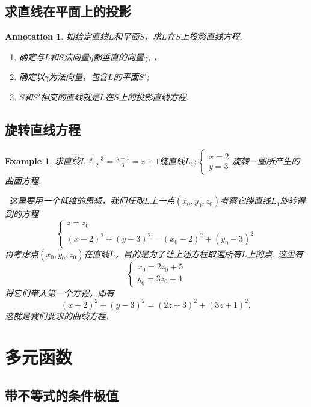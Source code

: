 \documentclass{article}
\newtheorem{example}[theorem]{Example}
\newtheorem{annotation}[theorem]{Annotation}
\newcommand{\hints}{{\color{blue} \text{hints}}}
\begin{document}
\subsection{求直线在平面上的投影}

\begin{annotation}
\rm 如给定直线$L$和平面$S$，求$L$在$S$上投影直线方程. 
\begin{enumerate}
	\item 确定与$L$和$S$法向量$\eta$都垂直的向量$\gamma$; 、
	\item 确定以$\gamma$为法向量，包含$L$的平面$S'$;
	\item $S$和$S'$相交的直线就是$L$在$S$上的投影直线方程. 
\end{enumerate}
\end{annotation}


\subsection{旋转直线方程}

\begin{example}
\rm 求直线$L: \frac{x-3}{2} = \frac{y-1}{3} = z+1$绕直线$L_1: \left\{ \begin{array}{ll}
x = 2\\
y = 3 
\end{array}\right.$旋转一圈所产生的曲面方程.

\hints\ 这里要用一个低维的思想，我们任取$L$上一点$(x_0,y_0,z_0)$考察它绕直线$L_1$旋转得到的方程
$$
\left\{
\begin{array}{ll}
z = z_0 \\
(x-2)^2 + (y-3)^2 = (x_0-2)^2 + (y_0-3)^2
\end{array} \right.
$$
再考虑点$(x_0,y_0,z_0)$在直线$L$，目的是为了让上述方程取遍所有$L$上的点. 这里有
$$
\left \{
\begin{array}{ll}
x_0 = 2z_0 + 5\\
y_0 = 3z_0 + 4 
\end{array} \right.
$$
将它们带入第一个方程，即有
$$
(x-2)^2 + (y-3)^2 = (2z+3)^2 + (3z+1)^2,
$$
这就是我们要求的曲线方程. 
\end{example}

\newpage
\section{多元函数}

\subsection{带不等式的条件极值}
\end{document}
